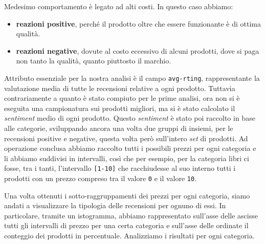 		Medesimo comportamento è legato ad alti costi. In questo caso abbiamo:
		
		\begin{itemize}
			\item \textbf{reazioni positive}, perché il prodotto oltre che essere funzionante è di ottima qualità.
			\item \textbf{reazioni negative}, dovute al costo eccessivo di alcuni prodotti, dove si paga non tanto la qualità, quanto piuttosto il marchio.
		\end{itemize}
	
		Attributo essenziale per la nostra analisi è il campo \verb|avg-rting|, rappresentante la valutazione media di tutte le recensioni relative a ogni prodotto. Tuttavia
		contrariamente a quanto è stato compiuto per le prime analisi, ora non si è eseguita una campionatura sui prodotti migliori, ma si è stato calcolato il \textit{sentiment} medio di ogni prodotto. Questo \textit{sentiment} è stato poi raccolto in base alle categorie, sviluppando ancora una volta due gruppi di insiemi, per le recensioni positive e negative, questa volta però sull'intero \textit{set} di prodotti. Ad operazione conclusa abbiamo raccolto tutti i possibili prezzi per ogni categoria e li abbiamo suddivisi in intervalli, così che per esempio, per la categoria libri ci fosse, tra i tanti, l'intervallo \verb|[1-10]| che racchiudesse al suo interno tutti i prodotti con un prezzo compreso tra il valore \verb|0| e il valore \verb|10|. 

		Una volta ottenuti i sotto-raggruppamenti dei prezzi per ogni categoria, siamo andati a visualizzare la tipologia delle recensioni per ognuno di essi. In particolare, tramite un istogramma, abbiamo rappresentato sull'asse delle ascisse tutti gli intervalli di prezzo per una certa categoria e sull'asse delle ordinate il conteggio dei prodotti in percentuale. Analizziamo i risultati per ogni categoria.
		
